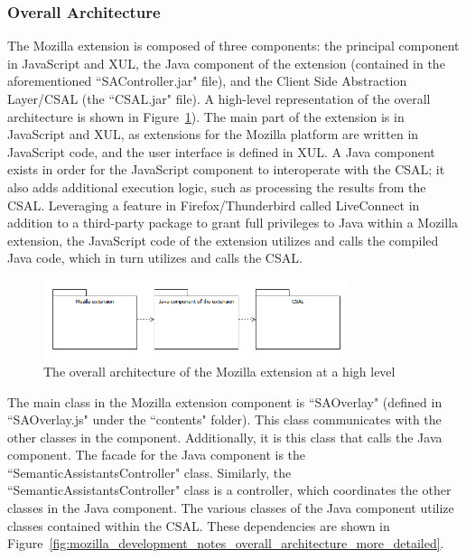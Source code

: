 \subsubsection{Overall Architecture}
The Mozilla extension is composed of three components: the principal component in JavaScript and XUL, the Java component of the extension (contained in the aforementioned ``SAController.jar" file), and the Client Side Abstraction Layer/CSAL (the ``CSAL.jar" file). A high-level representation of the overall architecture is shown in Figure~\ref{fig:mozilla_development_notes_overall_architecture_high_level}).
The main part of the extension is in JavaScript and XUL, as extensions for the Mozilla platform are written in JavaScript code, and the user interface is defined in XUL. A Java component exists in order for the JavaScript component to interoperate with the CSAL; it also adds additional execution logic, such as processing the results from the CSAL. Leveraging a feature in Firefox/Thunderbird called LiveConnect in addition to a third-party package to grant full privileges to Java within a Mozilla extension, the JavaScript code of the extension utilizes and calls the compiled Java code, which in turn utilizes and calls the CSAL. 

\begin{figure}[htb]
  \centering
  \includegraphics[width=0.8\textwidth]{pictures/mozilla_development_notes_overall_architecture_high_level.png}
  \caption{The overall architecture of the Mozilla extension at a high level}
  \label{fig:mozilla_development_notes_overall_architecture_high_level}
\end{figure}

The main class in the Mozilla extension component is ``SAOverlay" (defined in ``SAOverlay.js" under the ``contents" folder). This class communicates with the other classes in the component. Additionally, it is this class that calls the Java component. The facade for the Java component is the ``SemanticAssistantsController" class. Similarly, the ``SemanticAssistantsController" class is a controller, which coordinates the other classes in the Java component. The various classes of the Java component utilize classes contained within the CSAL. These dependencies are shown in Figure~\ref{fig:mozilla_development_notes_overall_architecture_more_detailed}.

